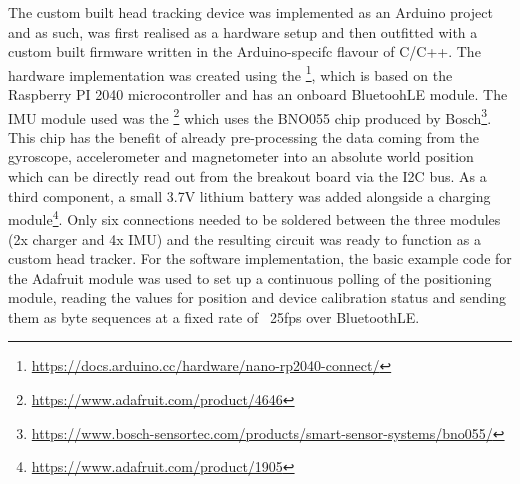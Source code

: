 The custom built head tracking device was implemented as an Arduino project and as such, was first realised as a hardware setup and then outfitted with a custom built firmware written in the Arduino-specifc flavour of C/C++.
The hardware implementation was created using the \footnote{\url{https://docs.arduino.cc/hardware/nano-rp2040-connect/}}, which is based on the Raspberry PI 2040 microcontroller and has an onboard BluetoohLE module.
The IMU module used was the \footnote{\url{https://www.adafruit.com/product/4646}} which uses the BNO055 chip produced by Bosch\footnote{\url{https://www.bosch-sensortec.com/products/smart-sensor-systems/bno055/}}.
This chip has the benefit of already pre-processing the data coming from the gyroscope, accelerometer and magnetometer into an absolute world position which can be directly read out from the breakout board via the \ac{I2C} bus.
As a third component, a small 3.7V lithium battery was added alongside a charging module\footnote{\url{https://www.adafruit.com/product/1905}}.
Only six connections needed to be soldered between the three modules (2x charger and 4x \ac{IMU}) and the resulting circuit was ready to function as a custom head tracker.
For the software implementation, the basic example code for the Adafruit module was used to set up a continuous polling of the positioning module, reading the values for position and device calibration status and sending them as byte sequences at a fixed rate of ~25fps over BluetoothLE.
